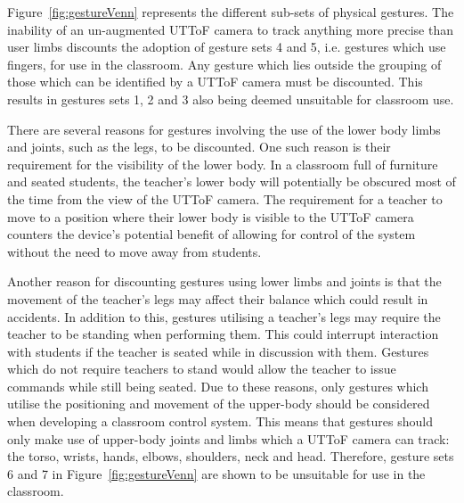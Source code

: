 \documentclass[manuscript, review, screen]{acmart}
\begin{document}
Figure~\ref{fig:gestureVenn} represents the different sub-sets of physical gestures.
The inability of an un-augmented \ac{UTToF} camera to track anything more precise than user limbs discounts the adoption of gesture sets 4 and 5, i.e. gestures which use fingers, for use in the classroom.
Any gesture which lies outside the grouping of those which can be identified by a \ac{UTToF} camera must be discounted.
This results in gestures sets 1, 2 and 3 also being deemed unsuitable for classroom use.

There are several reasons for gestures involving the use of the lower body limbs and joints, such as the legs, to be discounted.
One such reason is their requirement for the visibility of the lower body.
In a classroom full of furniture and seated students, the teacher's lower body will potentially be obscured most of the time from the view of the \ac{UTToF} camera.
The requirement for a teacher to move to a position where their lower body is visible to the \ac{UTToF} camera counters the device's potential benefit of allowing for control of the system without the need to move away from students.

Another reason for discounting gestures using lower limbs and joints is that the movement of the teacher's legs may affect their balance which could result in accidents.
In addition to this, gestures utilising a teacher's legs may require the teacher to be standing when performing them.
This could interrupt interaction with students if the teacher is seated while in discussion with them.
Gestures which do not require teachers to stand would allow the teacher to issue commands while still being seated.
Due to these reasons, only gestures which utilise the positioning and movement of the upper-body should be considered when developing a classroom control system.
This means that gestures should only make use of upper-body joints and limbs which a \ac{UTToF} camera can track: the torso, wrists, hands, elbows, shoulders, neck and head.
Therefore, gesture sets 6 and 7 in Figure~\ref{fig:gestureVenn} are shown to be unsuitable for use in the classroom.
\end{document}
